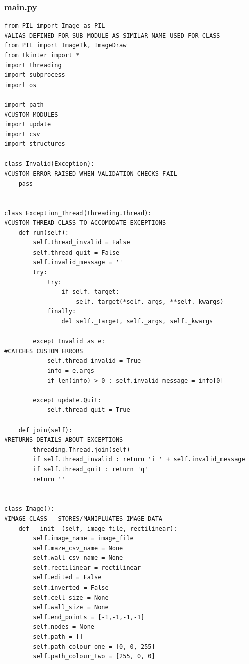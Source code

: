 \documentclass[titlepage]{article}
\begin{document}
\subsubsection{main.py}
\begin{changemargin}{-1in}{-1in} 
\begin{verbatim}
from PIL import Image as PIL                                                    #ALIAS DEFINED FOR SUB-MODULE AS SIMILAR NAME USED FOR CLASS
from PIL import ImageTk, ImageDraw
from tkinter import *
import threading
import subprocess
import os

import path                                                                     #CUSTOM MODULES
import update
import csv
import structures

class Invalid(Exception):                                                       #CUSTOM ERROR RAISED WHEN VALIDATION CHECKS FAIL
    pass


class Exception_Thread(threading.Thread):                                       #CUSTOM THREAD CLASS TO ACCOMODATE EXCEPTIONS
    def run(self):
        self.thread_invalid = False
        self.thread_quit = False
        self.invalid_message = ''
        try:
            try:
                if self._target:
                    self._target(*self._args, **self._kwargs)
            finally:
                del self._target, self._args, self._kwargs

        except Invalid as e:                                                    #CATCHES CUSTOM ERRORS
            self.thread_invalid = True
            info = e.args
            if len(info) > 0 : self.invalid_message = info[0]
        
        except update.Quit:
            self.thread_quit = True

    def join(self):                                                             #RETURNS DETAILS ABOUT EXCEPTIONS
        threading.Thread.join(self)
        if self.thread_invalid : return 'i ' + self.invalid_message
        if self.thread_quit : return 'q'
        return ''
    

class Image():                                                                  #IMAGE CLASS - STORES/MANIPLUATES IMAGE DATA
    def __init__(self, image_file, rectilinear):
        self.image_name = image_file
        self.maze_csv_name = None
        self.wall_csv_name = None
        self.rectilinear = rectilinear
        self.edited = False
        self.inverted = False
        self.cell_size = None
        self.wall_size = None
        self.end_points = [-1,-1,-1,-1]
        self.nodes = None
        self.path = []
        self.path_colour_one = [0, 0, 255]
        self.path_colour_two = [255, 0, 0]


\end{verbatim}
\end{changemargin}
\end{document}
